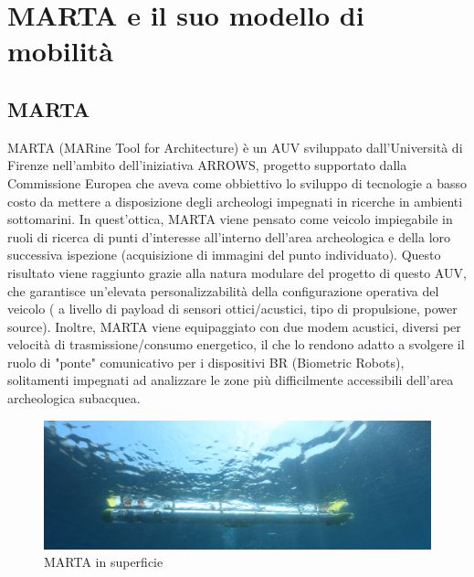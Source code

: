 \documentclass[Lau,binding=0.6cm]{sapthesis}
\begin{document}
\chapter{MARTA e il suo modello di mobilità}

\section{MARTA}

MARTA (MARine Tool for Architecture) è un AUV sviluppato dall'Università di Firenze nell'ambito dell'iniziativa ARROWS, progetto supportato dalla Commissione Europea che aveva come obbiettivo lo sviluppo di tecnologie a basso costo da mettere a disposizione degli archeologi impegnati in ricerche in ambienti sottomarini. In quest'ottica, MARTA viene pensato come veicolo impiegabile in ruoli di ricerca di punti d'interesse all'interno dell'area archeologica e della loro successiva ispezione (acquisizione di immagini del punto individuato). \newline
Questo risultato viene raggiunto grazie alla natura modulare del progetto di questo AUV, che garantisce un'elevata personalizzabilità della configurazione operativa del veicolo ( a livello di payload di sensori ottici/acustici, tipo di propulsione, power source). \newline
Inoltre, MARTA viene equipaggiato con due modem acustici, diversi per velocità di trasmissione/consumo energetico, il che lo rendono adatto a svolgere il ruolo di "ponte" comunicativo per i dispositivi BR (Biometric Robots), solitamenti impegnati ad analizzare le zone più difficilmente accessibili dell'area archeologica subacquea.

\begin{figure}[H]
	\includegraphics[width=\linewidth]{MARTA.png}
	\caption{MARTA in superficie}
	\label{fig:MARTA}
	\centering
\end{figure}
\end{document}
